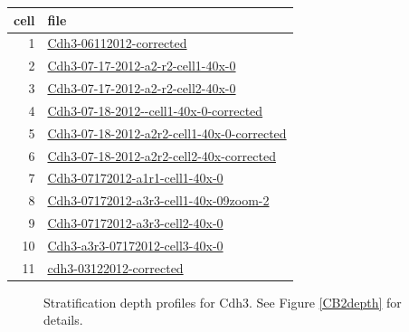 \documentclass{article}
\begin{document}
\begin{table}
  \centering
  \begin{tabular}{rl}
    \toprule
    cell & file \\
    \midrule
    1& \url{Cdh3-06112012-corrected} \\
    2& \url{Cdh3-07-17-2012-a2-r2-cell1-40x-0} \\
    3& \url{Cdh3-07-17-2012-a2-r2-cell2-40x-0} \\
    4& \url{Cdh3-07-18-2012--cell1-40x-0-corrected} \\
    5& \url{Cdh3-07-18-2012-a2r2-cell1-40x-0-corrected} \\
    6& \url{Cdh3-07-18-2012-a2r2-cell2-40x-corrected} \\
    7& \url{Cdh3-07172012-a1r1-cell1-40x-0} \\
    8& \url{Cdh3-07172012-a3r3-cell1-40x-09zoom-2} \\
    9& \url{Cdh3-07172012-a3r3-cell2-40x-0} \\
    10& \url{Cdh3-a3r3-07172012-cell3-40x-0} \\
    11& \url{cdh3-03122012-corrected} \\
    \bottomrule
  \end{tabular}
\end{table}



\clearpage


\begin{figure}
  \centering
  \caption{Stratification depth profiles for Cdh3. See Figure
    \ref{CB2depth} for details.}
\end{figure}
\end{document}
